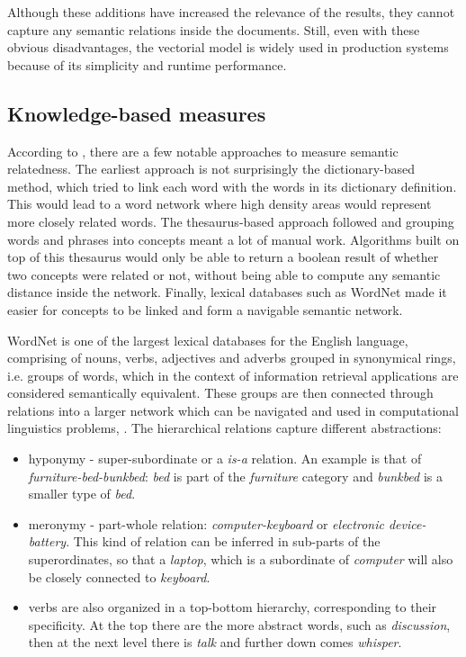 Although these additions have increased the relevance of the results, they cannot capture any semantic relations inside the documents. Still, even with these obvious disadvantages, the vectorial model is widely used in production systems because of its simplicity and runtime performance. 

\subsection{Knowledge-based measures}\label{section:knowledge-based-measures}

According to \citet{Budanitsky1999}, there are a few notable approaches to measure semantic relatedness. The earliest approach is not surprisingly the dictionary-based method, which tried to link each word with the words in its dictionary definition. This would lead to a word network where high density areas would represent more closely related words. The thesaurus-based approach followed and grouping words and phrases into concepts meant a lot of manual work. Algorithms built on top of this thesaurus would only be able to return a boolean result of whether two concepts were related or not, without being able to compute any semantic distance inside the network. Finally, lexical databases such as WordNet made it easier for concepts to be linked and form a navigable semantic network. 

WordNet is one of the largest lexical databases for the English language, comprising of nouns, verbs, adjectives and adverbs grouped in synonymical rings, i.e. groups of words, which in the context of information retrieval applications are considered semantically equivalent. These groups are then connected through relations into a larger network which can be navigated and used in computational linguistics problems, \citet{WordNet}. 
The hierarchical relations capture different abstractions:
\begin{itemize}
\item hyponymy - super-subordinate or a \textit{is-a} relation. An example is that of \textit{furniture-bed-bunkbed}: \textit{bed} is part of the \textit{furniture} category and \textit{bunkbed} is a smaller type of \textit{bed}.
\item meronymy - part-whole relation: \textit{computer-keyboard} or \textit{electronic device-battery}. This kind of relation can be inferred in sub-parts of the superordinates, so that a \textit{laptop}, which is a subordinate of \textit{computer} will also be closely connected to \textit{keyboard}.
\item verbs are also organized in a top-bottom hierarchy, corresponding to their specificity. At the top there are the more abstract words, such as \textit{discussion}, then at the next level there is \textit{talk} and further down comes \textit{whisper}.
\end{itemize}
 
